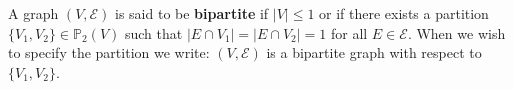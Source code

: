 A graph $(V, \mathcal{E})$ is said to be \textbf{bipartite} if $|V| \leq 1$ or if there exists a partition $\{V_1, V_2\} \in \mathbb{P}_2(V)$ such that $|E \cap V_1| = |E \cap V_2| = 1$ for all $E \in \mathcal{E}$. When we wish to specify the partition we write: $(V, \mathcal{E})$ is a bipartite graph with respect to $\{V_1, V_2\}$.

